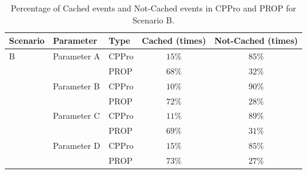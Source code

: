 \documentclass[10pt,final,journal,a4paper]{IEEEtran}
\begin{document}
\begin{table}[!t]
\caption{Percentage of Cached events and Not-Cached events in CPPro and PROP for Scenario B.}
\label{tab:stacked1scb}
\begin{tabular}{|l|l|l|c|c|}
\hline
Scenario & Parameter & Type & Cached (times)& Not-Cached (times) \\ %
\hline
B & Parameter A & CPPro &  $15\%$ & $85\%$ \\%
\hline
 &  & PROP & $68\%$ & $32\%$ \\ %
\hline

& Parameter B & CPPro & $10\%$ & $90\%$ \\ %
\hline
& & PROP & $72\%$ & $28\%$ \\%
\hline
& Parameter C & CPPro & $11\%$ & $89\%$  \\%
\hline
 & & PROP & $69\%$ & $31\%$ \\%
\hline

& Parameter D & CPPro & $15\%$ & $85\%$  \\%
\hline
 & & PROP & $73\%$ & $27\%$ \\%
\hline

\end{tabular}
\end{table}
\end{document}
